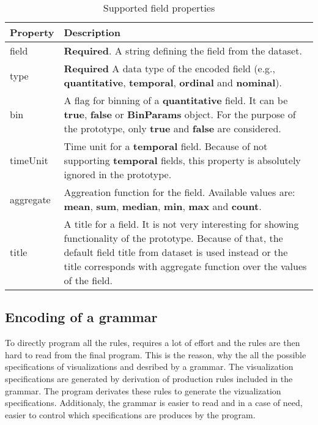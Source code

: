 \begin{table}[htbp]
      \centering
      \caption{Supported field properties\cite{vega-lite-channel-definition}}
      \label{table:channel-definition}
          \begin{tabular}{ m{8em} m{22em} }
          \toprule
              \textbf{Property} & \textbf{Description} \\
          \toprule

     field                         & \textbf{Required}. A string defining the field from the dataset. \\
\hline type    & \textbf{Required} A data type of the encoded field (e.g., \textbf{quantitative}, \textbf{temporal}, \textbf{ordinal} and \textbf{nominal}).  \\
\hline bin               & A flag for binning of a \textbf{quantitative} field. It can be \textbf{true}, \textbf{false} or \textbf{BinParams} object. For the purpose of the prototype, only \textbf{true} and \textbf{false} are considered.  \\
\hline timeUnit           & Time unit for a \textbf{temporal} field. Because of not supporting \textbf{temporal} fields, this property is absolutely ignored in the prototype. \\
\hline aggregate             & Aggreation function for the field. Available values are: \textbf{mean}, \textbf{sum}, \textbf{median}, \textbf{min}, \textbf{max} and \textbf{count}.  \\
\hline title     & A title for a field. It is not very interesting for showing functionality of the prototype. Because of that, the default field title from dataset is used instead or the title corresponds with aggregate function over the values of the field. \\
\hline
          \end{tabular}
      \end{table}
\clearpage

\subsection{Encoding of a grammar}
To directly program all the rules, requires a lot of effort and the rules are then hard to read from the final program. This is the reason, why the all the possible specifications of visualizations and desribed by a grammar. The visualization specifications are generated by derivation of production rules included in the grammar. The program derivates these rules to generate the vizualization specifications. Additionaly, the grammar is easier to read and in a case of need, easier to control which specifications are produces by the program.

